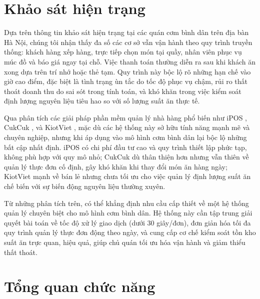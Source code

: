 \documentclass[../20232006p.tex]{subfiles}
\begin{document}
\section{Khảo sát hiện trạng}
\label{section:2.1}
Dựa trên thông tin khảo sát hiện trạng tại các quán cơm bình dân trên địa bàn Hà Nội, chúng tôi nhận thấy đa số các cơ sở vẫn vận hành theo quy trình truyền thống: khách hàng xếp hàng, trực tiếp chọn món tại quầy, nhân viên phục vụ múc đồ và báo giá ngay tại chỗ. Việc thanh toán thường diễn ra sau khi khách ăn xong dựa trên trí nhớ hoặc thẻ tạm. Quy trình này bộc lộ rõ những hạn chế vào giờ cao điểm, đặc biệt là tình trạng ùn tắc do tốc độ phục vụ chậm, rủi ro thất thoát doanh thu do sai sót trong tính toán, và khó khăn trong việc kiểm soát định lượng nguyên liệu tiêu hao so với số lượng suất ăn thực tế.

Qua phân tích các giải pháp phần mềm quản lý nhà hàng phổ biến như iPOS \cite{ipos}, CukCuk \cite{cukcuk}, và KiotViet \cite{kiotviet}, mặc dù các hệ thống này sở hữu tính năng mạnh mẽ và chuyên nghiệp, nhưng khi áp dụng vào mô hình cơm bình dân lại bộc lộ những bất cập nhất định. iPOS có chi phí đầu tư cao và quy trình thiết lập phức tạp, không phù hợp với quy mô nhỏ; CukCuk dù thân thiện hơn nhưng vẫn thiên về quản lý thực đơn cố định, gây khó khăn khi thay đổi món ăn hàng ngày; KiotViet mạnh về bán lẻ nhưng chưa tối ưu cho việc quản lý định lượng suất ăn chế biến với sự biến động nguyên liệu thường xuyên.

Từ những phân tích trên, có thể khẳng định nhu cầu cấp thiết về một hệ thống quản lý chuyên biệt cho mô hình cơm bình dân. Hệ thống này cần tập trung giải quyết bài toán về tốc độ xử lý giao dịch (dưới 30 giây/đơn), đơn giản hóa tối đa quy trình quản lý thực đơn động theo ngày, và cung cấp cơ chế kiểm soát tồn kho suất ăn trực quan, hiệu quả, giúp chủ quán tối ưu hóa vận hành và giảm thiểu thất thoát.
\section{Tổng quan chức năng}
\label{section:2.2}
\end{document}

